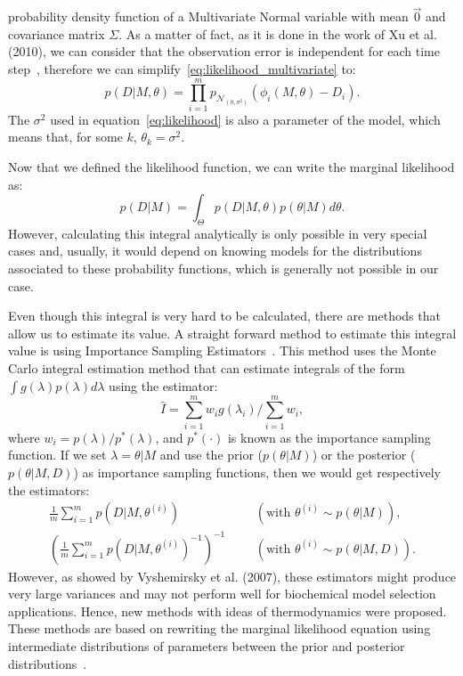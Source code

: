 probability density function of a Multivariate Normal variable with mean 
$\vec{0}$ and covariance matrix $\Sigma$. As a matter of fact, as it is
done in the work of Xu et al. (2010), we can consider that the 
observation error is independent for each time step~\cite{Xura20}, 
therefore we can simplify~\ref{eq:likelihood_multivariate} to:
\begin{equation}
    p (D | M, \theta) = \prod_{i = 1}^m p_{\mathcal{N}_{\left(0, 
        \sigma^2\right)}} (\phi_i (M,\theta) - D_i).
\label{eq:likelihood}
\end{equation}
The $\sigma^2$ used in equation~\ref{eq:likelihood} is also a parameter
of the model, which means that, for some $k$, $\theta_k = \sigma^2$.

Now that we defined the likelihood function, we can write the marginal 
likelihood as:
\begin{equation}
    p (D | M) = \int_{\Theta} p (D | M, \theta) p (\theta | M)d\theta.
\label{eq:marginal_likelihood}
\end{equation}
However, calculating this integral analytically is only possible in 
very special cases and, usually, it would depend on knowing models for 
the distributions associated to these probability functions, which is 
generally not possible in our case.

Even though this integral is very hard to be calculated, there are 
methods that allow us to estimate its value. A straight forward method 
to estimate this integral value is using Importance Sampling 
Estimators~\cite{Newton1993}. This method uses the Monte Carlo integral 
estimation method that can estimate integrals of the form 
$\int g(\lambda) p(\lambda)d\lambda$ using the estimator:
\begin{equation*}
    \hat{I} = \sum_{i = 1}^m w_i g(\lambda_i) / \sum_{i = 1}^m w_i,
\label{eq:importance_sampling_estimator}
\end{equation*}
where $w_i = p (\lambda) / p^* (\lambda)$, and $p^*(\cdot)$ is known as 
the importance sampling function. If we set $\lambda = \theta | M$ and
use the prior ($p(\theta | M)$) or the posterior ($p(\theta | M, D)$) as 
importance sampling functions, then we would get respectively the 
estimators:
\begin{equation*}
\begin{aligned}
    \frac{1}{m} \sum_{i = 1}^m p(D|M, \theta^{(i)}) &&& 
        (\text{with } \theta^{(i)} \sim p(\theta|M)), \\
    \left(\frac{1}{m} \sum_{i = 1}^m p(D|M, \theta^{(i)})^{-1} \right)^{-1} &&&
        (\text{with } \theta^{(i)} \sim p(\theta|M, D)).
\end{aligned}
\end{equation*}
However, as showed by Vyshemirsky et al. (2007), these estimators might
produce very large variances and may not perform well for biochemical
model selection applications. Hence, new methods with ideas of 
thermodynamics were proposed. These methods are based on rewriting the
marginal likelihood equation using intermediate distributions of 
parameters between the prior and posterior 
distributions~\cite{Friel2008}.


